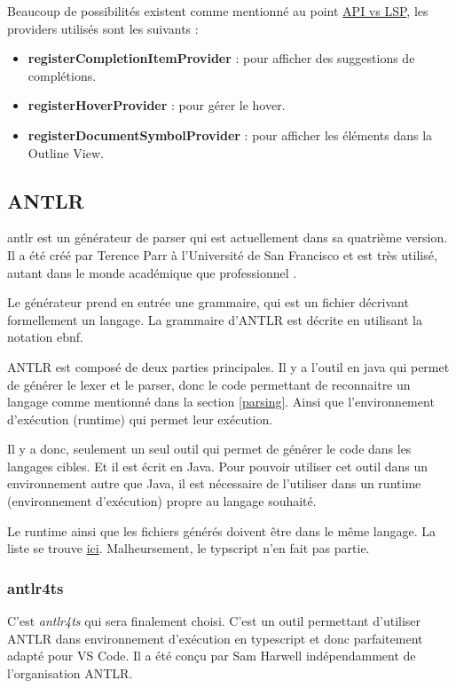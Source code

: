 \documentclass[
    iict, %
    il, %
]{heig-tb}
\begin{document}
Beaucoup de possibilités existent comme mentionné au point \hyperref[api vs lsp]{API vs LSP}, les providers utilisés sont les suivants :
\begin{itemize}
    \item \textbf{registerCompletionItemProvider} : pour afficher des suggestions de complétions.
    \item \textbf{registerHoverProvider} : pour gérer le hover.
    \item \textbf{registerDocumentSymbolProvider} : pour afficher les éléments dans la Outline View.
\end{itemize}

\subsection{ANTLR}

\Gls{antlr} est un générateur de parser qui est actuellement dans sa quatrième version.
Il a été créé par Terence Parr à l'Université de San Francisco et est très utilisé, autant dans le monde académique que professionnel \cite{antlr}.

Le générateur prend en entrée une grammaire, qui est un fichier décrivant formellement un langage. La grammaire d'ANTLR est décrite en utilisant la notation \Gls{ebnf}.

ANTLR est composé de deux parties principales. Il y a l'outil en java qui permet de générer le lexer et le parser, donc le code permettant de reconnaitre un langage comme mentionné dans la section \ref{parsing}.
Ainsi que l'environnement d'exécution (runtime) qui permet leur exécution.

Il y a donc, seulement un seul outil qui permet de générer le code dans les langages cibles. Et il est écrit en Java.
Pour pouvoir utiliser cet outil dans un environnement autre que Java, il est nécessaire de l'utiliser dans un runtime (environnement d'exécution) propre au langage souhaité.

Le runtime ainsi que les fichiers générés doivent être dans le même langage. La liste se trouve \href{https://github.com/antlr/antlr4/blob/master/doc/targets.md}{ici}.
Malheursement, le typscript n'en fait pas partie.

\subsubsection{antlr4ts}
C'est \emph{antlr4ts} qui sera finalement choisi. C'est un outil permettant d'utiliser ANTLR dans environnement d'exécution en typescript et donc parfaitement adapté pour VS Code.
Il a été conçu par Sam Harwell indépendamment de l'organisation ANTLR.
\end{document}
